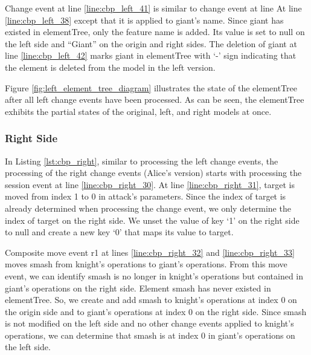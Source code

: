 Change event at line \ref{line:cbp_left_41} is similar to change event at line At line \ref{line:cbp_left_38} except that it is applied to \textsf{giant}'s \textsf{name}. Since \textsf{giant} has existed in \textsf{elementTree}, only the feature \textsf{name} is added. Its value is set to null on the left side and ``Giant'' on the origin and right sides. The deletion of \textsf{giant} at line \ref{line:cbp_left_42} marks \textsf{giant} in \textsf{elementTree} with `-' sign indicating that the element is deleted from the model in the left version.

Figure \ref{fig:left_element_tree_diagram} illustrates the state of the \textsf{elementTree} after all left change events have been processed. As can be seen, the \textsf{elementTree} exhibits the partial states of the original, left, and right models at once. 

\subsubsection{Right Side}\label{sec:right_side}
In Listing \ref{lst:cbp_right}, similar to processing the left change events, the processing of the right change events (Alice's version) starts with processing the session event at line \ref{line:cbp_right_30}. At line \ref{line:cbp_right_31}, \textsf{target} is moved from index 1 to 0 in \textsf{attack}'s \textsf{parameters}. Since the index of \textsf{target} is already determined when processing the change event, we only determine the index of \textsf{target} on the right side. We unset the value of key `1' on the right side to null and create a new key `0' that maps its value to \textsf{target}.

Composite move event \textsf{r1} at lines \ref{line:cbp_right_32} and \ref{line:cbp_right_33} moves \textsf{smash} from \textsf{knight}'s \textsf{operations} to \textsf{giant}'s \textsf{operations}. From this move event, we can identify \textsf{smash} is no longer in \textsf{knight}'s \textsf{operations} but contained in \textsf{giant}'s \textsf{operations} on the right side. Element \textsf{smash} has never existed in \textsf{elementTree}. So, we create and add \textsf{smash} to \textsf{knight}'s \textsf{operations} at index 0 on the origin side and to \textsf{giant}'s \textsf{operations} at index 0 on the right side. Since \textsf{smash} is not modified on the left side and no other change events applied to \textsf{knight}'s \textsf{operations}, we can determine that \textsf{smash} is at index 0 in \textsf{giant}'s \textsf{operations} on the left side.

